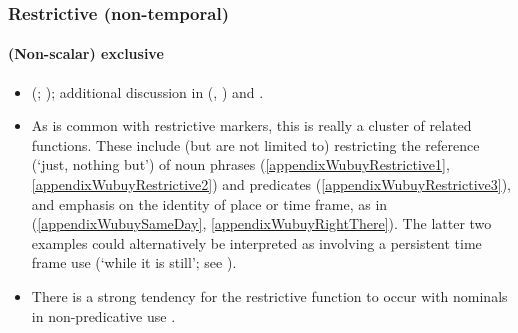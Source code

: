 \subsubsection{Restrictive (non-temporal)}
\paragraph{(Non-scalar) exclusive}
\label{appendixWubuyRestrictive}
\begin{itemize}
	\item \citeauthor{Heath1982} (\citeyear[238, 298]{Heath1982}; \citeyear[170, 217, 335, 447–448]{Heath1984}); additional discussion in \citeauthor{vanBaar1991} (\citeyear{vanBaar1991}, \citeyear[111]{vanBaar1997}) and \textcite{SchultzeBerndt2002}.
	\item As is common with restrictive markers, this is really a cluster of related functions. These include (but are not limited to) restricting the reference (\lq just, nothing but') of noun phrases (\ref{appendixWubuyRestrictive1}, \ref{appendixWubuyRestrictive2}) and predicates (\ref{appendixWubuyRestrictive3}), and emphasis on the identity of place or time frame, as in (\ref{appendixWubuySameDay}, \ref{appendixWubuyRightThere}). The latter two examples could alternatively be interpreted as involving a persistent time frame use (\lq while it is still'; see ).
\item There is a strong tendency for the restrictive function to occur with nominals in non-predicative use \parencite[447]{Heath1984}.
\end{itemize}
